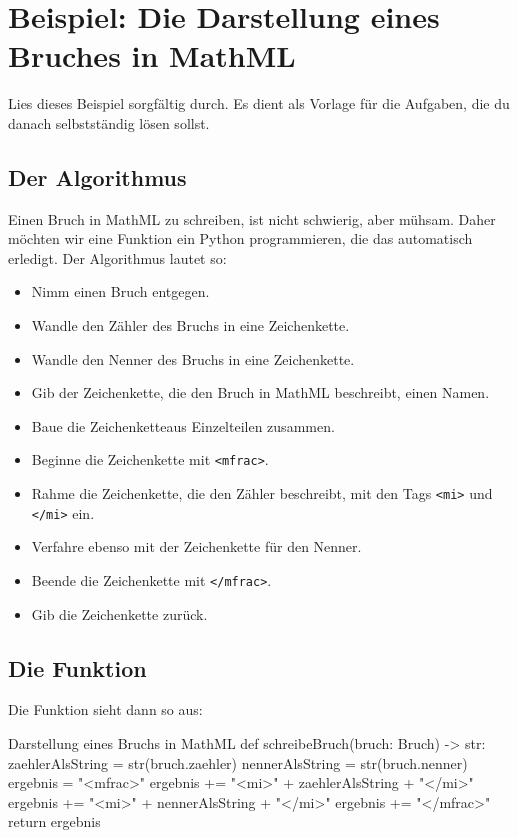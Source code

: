 \section{Beispiel: Die Darstellung eines Bruches in MathML}

Lies dieses Beispiel sorgfältig durch. Es dient als Vorlage für die Aufgaben, die du danach selbstständig lösen sollst.

\subsection{Der Algorithmus}

Einen Bruch in MathML zu schreiben, ist nicht schwierig, aber mühsam. Daher möchten wir eine Funktion ein Python programmieren, die das automatisch erledigt. Der Algorithmus lautet so:
\begin{itemize}
	\item Nimm einen Bruch entgegen.
	\item Wandle den Zähler des Bruchs in eine Zeichenkette.
	\item Wandle den Nenner des Bruchs in eine Zeichenkette.
	\item Gib der Zeichenkette, die den Bruch in MathML beschreibt, einen Namen.
	\item Baue die Zeichenketteaus Einzelteilen zusammen.
	\item Beginne die Zeichenkette mit \texttt{<mfrac>}.
	\item Rahme die Zeichenkette, die den Zähler beschreibt, mit den Tags \texttt{<mi>} und \texttt{</mi>} ein.
	\item Verfahre ebenso mit der Zeichenkette für den Nenner.
	\item Beende die Zeichenkette mit \texttt{</mfrac>}.
	\item Gib die Zeichenkette zurück.
\end{itemize}

\subsection{Die Funktion}

Die Funktion sieht dann so aus:

\begin{codePython}{Darstellung eines Bruchs in MathML}
def schreibeBruch(bruch: Bruch) -> str:
	zaehlerAlsString = str(bruch.zaehler)
	nennerAlsString = str(bruch.nenner)
	ergebnis = "<mfrac>"
	ergebnis += "<mi>" + zaehlerAlsString + "</mi>"
	ergebnis += "<mi>" + nennerAlsString + "</mi>"
	ergebnis += "</mfrac>"
	return ergebnis
\end{codePython}

